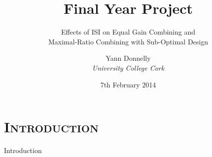 \documentclass[xcolor=x11names,compress]{beamer}
\renewcommand{\(}{\begin{columns}}
\renewcommand{\)}{\end{columns}}
\newcommand{\<}[1]{\begin{column}{#1}}
\renewcommand{\>}{\end{column}}
\begin{document}
\section{\scshape Introduction}
\begin{frame}
\title{Final Year Project}
\subtitle{Effects of ISI on Equal Gain Combining and\\
Maximal-Ratio Combining with Sub-Optimal Design}
\author{
	Yann Donnelly\\
	{\it University College Cork}\\
}
\date{
	\vspace{1cm}
	7th February 2014
}
\titlepage
\end{frame}


\begin{frame}{Introduction}
\tableofcontents
\end{frame}

\end{document}
